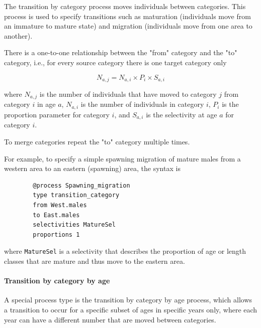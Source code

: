 The transition by category process moves individuals between categories. This process is used to specify transitions such as maturation (individuals move from an immature to mature state) and migration (individuals move from one area to another).

There is a one-to-one relationship between the "from" category and the "to" category, i.e., for every source category there is one target category only

\begin{equation}
	N_{a,j} = N_{a,i} \times P_i \times S_{a,i}
\end{equation}

where $N_{a,j}$ is the number of individuals that have moved to category $j$ from category $i$ in age $a$, $N_{a,i}$ is the number of individuals in category $i$, $P_i$ is the proportion parameter for category $i$, and $S_{a,i}$ is the selectivity at age $a$ for category $i$.

To merge categories repeat the "to" category multiple times.

For example, to specify a simple spawning migration of mature males from a western area to an eastern (spawning) area, the syntax is

{\small{\begin{verbatim}
		@process Spawning_migration
		type transition_category
		from West.males
		to East.males
		selectivities MatureSel
		proportions 1
		\end{verbatim}}}

where \texttt{MatureSel} is a selectivity that describes the proportion of age or length classes that are mature and thus move to the eastern area.

\paragraph{Transition by category by age}\label{sec:Process-TransitionCategoryByAge}

A special process type is the transition by category by age process, which allows a transition to occur for a specific subset of ages in specific years only, where each year can have a different number that are moved between categories.

\subsubsection{}\label{sec:Process-TagByAge}\label{sec:Process-TagByLength} 

